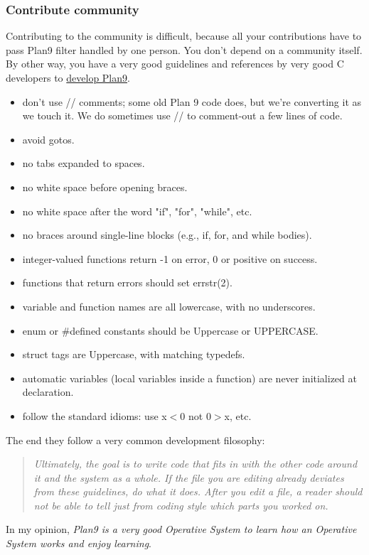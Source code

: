 \subsubsection{ Contribute \nolinebreakto community} Contributing to the community is difficult, because all your contributions have to pass Plan9 filter handled by one person. You don't depend on a community itself.
\\ By other way, you have a very good guidelines and references by very good C developers to \href{http://plan9.bell-labs.com/magic/man2html/6/style}{develop Plan9}.
\begin{itemize}
	\item don't use // comments; some old Plan 9 code does, but we're converting it as we touch it. We do sometimes use // to comment-out a few lines of code.
	\item avoid gotos.
	\item no tabs expanded to spaces.
	\item no white space before opening braces.
	\item no white space after the word "if", "for", "while", etc.
	\item no braces around single-line blocks (e.g., if, for, and while bodies).
	\item integer-valued functions return -1 on error, 0 or positive on success.
	\item functions that return errors should set errstr(2).
	\item variable and function names are all lowercase, with no underscores.
	\item enum or \#defined constants should be Uppercase or UPPERCASE.
	\item struct tags are Uppercase, with matching typedefs.
	\item automatic variables (local variables inside a function) are never initialized at declaration.
	\item follow the standard idioms: use x$<$0 not 0$>$x, etc.
\end{itemize} The end they follow a very common development filosophy:
\\
\begin{quotation}\textit{Ultimately, the goal is to write code that fits in with the other code around it and the system as a whole. If the file you are editing already deviates from these guidelines, do what it does. After you edit a file, a reader should not be able to tell just from coding style which parts you worked on.}
\end{quotation} In my opinion, \textit{Plan9 is a very good Operative System to learn how an Operative System works and enjoy learning}.
\\